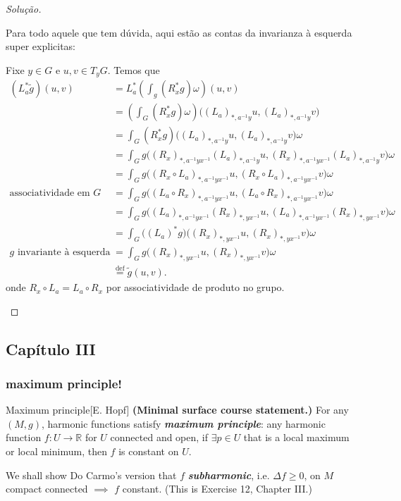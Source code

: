 \begin{proof}[Solução]
\begin{enumerate}[label=(\alph*)]
Para todo aquele que tem dúvida, aqui estão as contas da invarianza à esquerda super explicitas:

Fixe \(y \in G\) e \(u,v \in T_yG\). Temos que
\begin{align*}
	(L_a ^*\tilde{g})(u,v)&=L^* _a\left(\int_g(R_x^*g)\omega\right)(u,v)\\
	&=\left(\int_G (R_x^*g)\omega\right)\Big((L_a)_{*,a^{-1}y}u,(L_a)_{*,a^{-1}y}v\Big)\\
	&=\int_G(R_x^* g)\Big((L_a)_{*,a^{-1}y}u,(L_a)_{*,a^{-1}y}v\Big)\omega\\
	&=\int_Gg\Big((R_x)_{*,a^{-1}yx^{-1}}(L_a)_{*,a^{-1}y}u,(R_x)_{*,a^{-1}yx^{-1}}(L_a)_{*,a^{-1}y}v\Big)\omega\\
	&=\int_Gg\Big((R_x \circ L_a)_{*,a^{-1}yx^{-1}}u,(R_x\circ L_a)_{*,a^{-1}yx^{-1}}v\Big)\omega\\
	\text{associatividade em \(G\)} \qquad &=\int_Gg\Big((L_a \circ R_x)_{*,a^{-1}y x^{-1}}u,(L_a \circ R_x)_{*,a^{-1}yx^{-1}}v\Big)\omega\\
	&=\int_Gg\Big((L_a)_{*,a^{-1}yx^{-1}}(R_x)_{*,yx^{-1}}u,(L_a)_{*,a^{-1}yx^{-1}}(R_x)_{*,yx^{-1}}v\Big)\omega\\
	&=\int_G\Big((L_a)^* g\Big)\Big((R_x)_{*,yx^{-1}}u,(R_x)_{*,yx^{-1}}v\Big)\omega\\
\text{\(g\) invariante à esquerda} \qquad 	&=\int_Gg\Big((R_x)_{*,yx^{-1}}u,(R_x)_{*,yx^{-1}}v\Big)\omega\\
	&\overset{\operatorname{def}}{=}\tilde{g}(u,v).
\end{align*}
onde \(R_x \circ L_a=L_a \circ R_x\) por associatividade de produto no grupo.

\end{enumerate}
\end{proof}

\subsection{Capítulo III}

\subsubsection{maximum principle!}

\begin{thing7}{Maximum principle}[E. Hopf]\leavevmode
\textbf{(Minimal surface course statement.)} For any \((M,g)\), harmonic functions satisfy \textit{\textbf{maximum principle}}: any harmonic function \(f:U \to \mathbb{R}\) for \(U\) connected and open, if \(\exists p \in U\) that is a local maximum or local minimum, then \(f\) is constant on \(U\).

We shall show Do Carmo's version that \(f\) \textit{\textbf{subharmonic}}, i.e. \(\Delta f\geq 0\), on \(M\) compact connected \(\implies\) \(f\) constant. (This is Exercise 12, Chapter III.)
\end{thing7}

